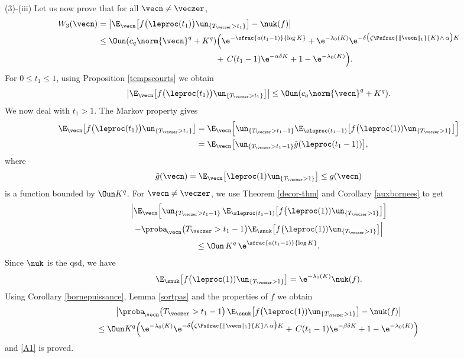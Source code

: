 (3)-(iii) Let us now prove that for all $\vecn\neq \veczer$,
\begin{equation}
\label{A1}
\begin{split}
W_{3}(\vecn)
&= \left|\E_{\vecn}\bigl[f\bigl(\leproc(t_{1})\bigr)\un_{\{T_{\veczer}>t_{1}\}}\bigr]-\nuk(f)\right| \\
& \leq \Oun (c_q \norm{\vecn}^{q} + K^q)\Bigl(\e^{-\sfrac{a (t_{1}-1)}{\log K}} + \e^{-\lambda_0(K)}
\e^{-\delta\bigl(\zeta\Psfrac{\|\vecn\|_{1}}{K}\wedge\, \alpha \bigr)K} \\
& \hspace*{5cm} + \,C(t_1-1)\e^{-\alpha\delta K}+1-\e^{-\lambda_0(K)}\Bigr).
\end{split}
\end{equation}
For $0\leq t_1\leq 1$, using Proposition \ref{tempscourts} we obtain
\[
\left|
\E_{\vecn}\bigl[f\bigl(\leproc(t_{1})\bigr)\un_{\{T_{\veczer}>t_{1}\}}\bigr]\right|
\leq \Oun (c_q\norm{\vecn}^{q} + K^q).
\]
We now deal with $t_1>1$.
The Markov property gives
\begin{align*}
\E_{\vecn}\bigl[f\bigl(\leproc(t_{1})\bigr)\un_{\{T_{\veczer}>t_{1}\}}\bigr]
& = \E_{\vecn}\Bigl[\un_{\{T_{\veczer}>t_{1}-1\}}
\E_{\sleproc(t_{1}-1)}\bigl[f\bigl(\leproc(1)) \un_{\{T_{\veczer}>1\}}\bigr]\Bigr]\\
& = \E_{\vecn}\bigl[\un_{\{T_{\veczer}>t_{1}-1\}}
\tilde g(\leproc(t_{1}-1))\bigr],
\end{align*}
where
\[
\tilde g (\vecn) = \E_{\vecn}\bigl[\leproc(1) \un_{\{T_{\veczer}>1\}}\bigr] \leq g(\vecn)
\]
is a function bounded by $\Oun K^q$.
For $\vecn\neq \veczer$, we use Theorem \ref{decor-thm} and Corollary \ref{auxbornees} to get
\begin{multline*}
\Big|
\E_{\vecn}\Bigl[\un_{\{T_{\veczer}>t_{1}-1\}}\,
\E_{\sleproc(t_{1}-1)}\bigl[f\bigl(\leproc(1)) \un_{\{T_{\veczer}>1\}}\bigr]
\Bigr] \\
-\proba_{\!\vecn}\bigl(T_{\veczer}>t_1-1\bigr) \E_{\snuk}\bigl[f\bigl(\leproc(1)) \un_{\{T_{\veczer}>1\}}\bigr]
\Big| \\
\leq\Oun\, K^q\, \e^{\sfrac{a(t_{1}-1)}{\log K}}.
\end{multline*}
Since $\nuk$ is the qsd, we have
\[
\E_{\snuk}\bigl[f\bigl(\leproc(1)) \un_{\{T_{\veczer}>1\}}\bigr]= \e^{-\lambda_0(K)} \nuk(f).
\]
Using Corollary \ref{bornepuissance}, Lemma \ref{sortpas} and the properties of $f$ we obtain
\begin{multline*}
\left|\proba_{\!\vecn}\bigl(T_{\veczer}>t_1-1\bigr)\, \E_{\snuk}\bigl[f\bigl(\leproc(1)) \un_{\{T_{\veczer}>1\}}\bigr]
-\nuk(f)\right|\\
\leq \Oun K^q\Bigl(\e^{-\lambda_0(K)}\e^{-\delta\bigl(\zeta\Psfrac{\|\vecn\|_{1}}{K}\wedge\, \alpha \bigr)K} +\, C(t_1-1)\e^{-\beta\delta K}+
1-\e^{-\lambda_0(K)}\Bigr)
\end{multline*}
and \eqref{A1} is proved.

